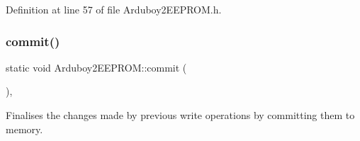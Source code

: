 Definition at line 57 of file Arduboy2\+E\+E\+P\+R\+O\+M.\+h.

\mbox{\label{classArduboy2EEPROM_a3804f82ad79284baa047fa3572ea1db5}} 
\subsubsection{\texorpdfstring{commit()}{commit()}}
{\footnotesize\ttfamily static void Arduboy2\+E\+E\+P\+R\+O\+M\+::commit (\begin{DoxyParamCaption}{ }\end{DoxyParamCaption})\hspace{0.3cm}{\ttfamily [inline]}, {\ttfamily [static]}}



Finalises the changes made by previous write operations by committing them to memory. 

